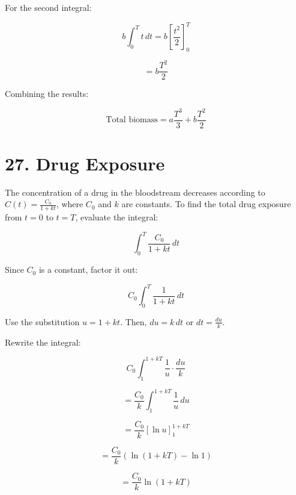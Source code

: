 \documentclass{article}
\begin{document}
For the second integral:

\[
b \int_{0}^{T} t \, dt = b \left[ \frac{t^2}{2} \right]_{0}^{T}
\]

\[
= b \frac{T^2}{2}
\]

Combining the results:

\[
\text{Total biomass} = a \frac{T^3}{3} + b \frac{T^2}{2}
\]

\section*{27. Drug Exposure}

The concentration of a drug in the bloodstream decreases according to \( C(t) = \frac{C_0}{1 + k t} \), where \( C_0 \) and \( k \) are constants. To find the total drug exposure from \( t = 0 \) to \( t = T \), evaluate the integral:

\[
\int_{0}^{T} \frac{C_0}{1 + k t} \, dt
\]

Since \( C_0 \) is a constant, factor it out:

\[
C_0 \int_{0}^{T} \frac{1}{1 + k t} \, dt
\]

Use the substitution \( u = 1 + k t \). Then, \( du = k \, dt \) or \( dt = \frac{du}{k} \).

Rewrite the integral:

\[
C_0 \int_{1}^{1 + k T} \frac{1}{u} \cdot \frac{du}{k}
\]

\[
= \frac{C_0}{k} \int_{1}^{1 + k T} \frac{1}{u} \, du
\]

\[
= \frac{C_0}{k} \left[ \ln u \right]_{1}^{1 + k T}
\]

\[
= \frac{C_0}{k} \left( \ln (1 + k T) - \ln 1 \right)
\]

\[
= \frac{C_0}{k} \ln (1 + k T)
\]
\end{document}

